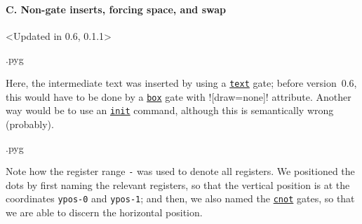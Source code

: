 \documentclass{scrartcl}
\makeatletter
\newenvironment{codeexample}{%
   \VerbatimEnvironment%
   \let\FVB@VerbatimOut\minted@FVB@VerbatimOut
   \let\FVE@VerbatimOut\minted@FVE@VerbatimOut
   \minted@configlang{tex}%
   \minted@fvset
   \begin{VerbatimOut}[codes={\catcode`\^^I=12},firstline,lastline]{\minted@jobname.pyg}%
}{
   \end{VerbatimOut}%
   \minted@langlinenoson%
   \savebox\codeexamplebox{ \minted@jobname.pyg}%
   \ifdim\wd\codeexamplebox>\dimexpr.5\linewidth-3mm\relax%
      \wd\codeexamplebox=.5\linewidth%
   \else%
      \wd\codeexamplebox=\dimexpr\wd\codeexamplebox+3mm\relax%
   \fi%
   \noindent\begin{minipage}{\wd\codeexamplebox}%
      \centering%
      \usebox\codeexamplebox%
   \end{minipage}%
   \begin{minipage}{\dimexpr\linewidth-\wd\codeexamplebox\relax}%
      \expandafter\minted@pygmentize\expandafter{\minted@lang}%
   \end{minipage}%
   \minted@langlinenosoff%
   \par%
}
\def\gate#1{\hyperref[gate:#1]{\texttt{#1}}}
\makeatother
\begin{document}
            \paragraph{C. Non-gate inserts, forcing space, and swap}\leavevmode
               \begin{example}<Updated in 0.6, 0.1.1>
                  \begin{codeexample}
                  \end{codeexample}
                  Here, the intermediate text was inserted by using a \gate{text} gate; before version~0.6, this would have to be done by a \gate{box} gate with \yquant![draw=none]! attribute.
                  Another way would be to use an \gate{init} command, although this is semantically wrong (probably).
               \end{example}

               \begin{example}
                  \begin{codeexample}
                  \end{codeexample}
                  Note how the register range \texttt{-} was used to denote all registers.
                  We positioned the dots by first naming the relevant registers, so that the vertical position is at the coordinates \texttt{ypos-0} and \texttt{ypos-1}; and then, we also named the \gate{cnot} gates, so that we are able to discern the horizontal position.
               \end{example}

            \clearpage
\end{document}
